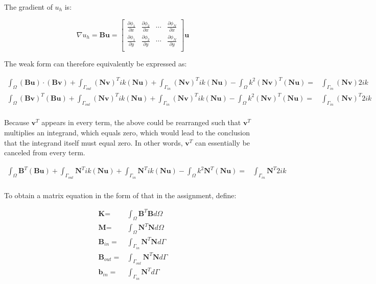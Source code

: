 \documentclass[10pt]{article}
\newcommand{\beq}{\begin{equation}}
\newcommand{\eeq}{\end{equation}}
\newcommand{\beqa}{\begin{equation}\begin{aligned}}
\newcommand{\eeqa}{\end{aligned}\end{equation}}
\begin{document}
The gradient of \(u_h\) is:

\beq
\nabla u_h=\textbf{B}\textbf{u}=\begin{bmatrix} 
\frac{\partial \phi_1}{\partial x} & \frac{\partial \phi_2}{\partial x} & \cdots & \frac{\partial \phi_N}{\partial x}\\
\frac{\partial \phi_1}{\partial y} & \frac{\partial \phi_2}{\partial y} & \cdots & \frac{\partial \phi_N}{\partial y}\\
\end{bmatrix}\textbf{u}
\eeq

The weak form can therefore equivalently be expressed as:

\beqa
\int_{\Omega}(\textbf{B}\textbf{u})\cdot(\textbf{B}\textbf{v})+\int_{\Gamma_{out}}(\textbf{N}\textbf{v})^Tik(\textbf{N}\textbf{u})+\int_{\Gamma_{in}}(\textbf{N}\textbf{v})^Tik(\textbf{N}\textbf{u})-\int_{\Omega}k^2(\textbf{N}\textbf{v})^T(\textbf{N}\textbf{u})=&\int_{\Gamma_{in}}(\textbf{N}\textbf{v})2ik\\
\int_{\Omega}(\textbf{B}\textbf{v})^T(\textbf{B}\textbf{u})+\int_{\Gamma_{out}}(\textbf{N}\textbf{v})^Tik(\textbf{N}\textbf{u})+\int_{\Gamma_{in}}(\textbf{N}\textbf{v})^Tik(\textbf{N}\textbf{u})-\int_{\Omega}k^2(\textbf{N}\textbf{v})^T(\textbf{N}\textbf{u})=&\int_{\Gamma_{in}}(\textbf{N}\textbf{v})^T2ik\\
\eeqa

Because \(\textbf{v}^T\) appears in every term, the above could be rearranged such that \(\textbf{v}^T\) multiplies an integrand, which equals zero, which would lead to the conclusion that the integrand itself must equal zero. In other words, \(\textbf{v}^T\) can essentially be canceled from every term.

\beqa
\int_{\Omega}\textbf{B}^T(\textbf{B}\textbf{u})+\int_{\Gamma_{out}}\textbf{N}^Tik(\textbf{N}\textbf{u})+\int_{\Gamma_{in}}\textbf{N}^Tik(\textbf{N}\textbf{u})-\int_{\Omega}k^2\textbf{N}^T(\textbf{N}\textbf{u})=&\int_{\Gamma_{in}}\textbf{N}^T2ik\\
\eeqa

To obtain a matrix equation in the form of that in the assignment, define:

\beqa
\textbf{K}=&\int_{\Omega}\textbf{B}^T\textbf{B}d\Omega\\
\textbf{M}=&\int_{\Omega}\textbf{N}^T\textbf{N}d\Omega\\
\textbf{B}_{in}=&\int_{\Gamma_{in}}\textbf{N}^T\textbf{N}d\Gamma\\
\textbf{B}_{out}=&\int_{\Gamma_{out}}\textbf{N}^T\textbf{N}d\Gamma\\
\textbf{b}_{in}=&\int_{\Gamma_{in}}\textbf{N}^Td\Gamma\\
\eeqa
\end{document}
